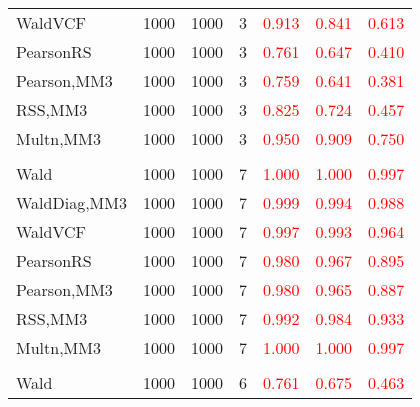 \documentclass[
]{article}
\begin{document}
\begin{table}[H]
{\begin{tabular}[t]{lrrrrrr}
\hspace{1em}WaldVCF & 1000 & 1000 & 3 & \textcolor{red}{0.913} & \textcolor{red}{0.841} & \textcolor{red}{0.613}\\
\hspace{1em}PearsonRS & 1000 & 1000 & 3 & \textcolor{red}{0.761} & \textcolor{red}{0.647} & \textcolor{red}{0.410}\\
\hspace{1em}Pearson,MM3 & 1000 & 1000 & 3 & \textcolor{red}{0.759} & \textcolor{red}{0.641} & \textcolor{red}{0.381}\\
\hspace{1em}RSS,MM3 & 1000 & 1000 & 3 & \textcolor{red}{0.825} & \textcolor{red}{0.724} & \textcolor{red}{0.457}\\
\hspace{1em}Multn,MM3 & 1000 & 1000 & 3 & \textcolor{red}{0.950} & \textcolor{red}{0.909} & \textcolor{red}{0.750}\\
\addlinespace[0.3em]
\multicolumn{7}{l}{\textbf{1F 15V}}\\
\hspace{1em}Wald & 1000 & 1000 & 7 & \textcolor{red}{1.000} & \textcolor{red}{1.000} & \textcolor{red}{0.997}\\
\hspace{1em}WaldDiag,MM3 & 1000 & 1000 & 7 & \textcolor{red}{0.999} & \textcolor{red}{0.994} & \textcolor{red}{0.988}\\
\hspace{1em}WaldVCF & 1000 & 1000 & 7 & \textcolor{red}{0.997} & \textcolor{red}{0.993} & \textcolor{red}{0.964}\\
\hspace{1em}PearsonRS & 1000 & 1000 & 7 & \textcolor{red}{0.980} & \textcolor{red}{0.967} & \textcolor{red}{0.895}\\
\hspace{1em}Pearson,MM3 & 1000 & 1000 & 7 & \textcolor{red}{0.980} & \textcolor{red}{0.965} & \textcolor{red}{0.887}\\
\hspace{1em}RSS,MM3 & 1000 & 1000 & 7 & \textcolor{red}{0.992} & \textcolor{red}{0.984} & \textcolor{red}{0.933}\\
\hspace{1em}Multn,MM3 & 1000 & 1000 & 7 & \textcolor{red}{1.000} & \textcolor{red}{1.000} & \textcolor{red}{0.997}\\
\addlinespace[0.3em]
\multicolumn{7}{l}{\textbf{2F 10V}}\\
\hspace{1em}Wald & 1000 & 1000 & 6 & \textcolor{red}{0.761} & \textcolor{red}{0.675} & \textcolor{red}{0.463}\\

\end{tabular}}
\end{table}
\end{document}
